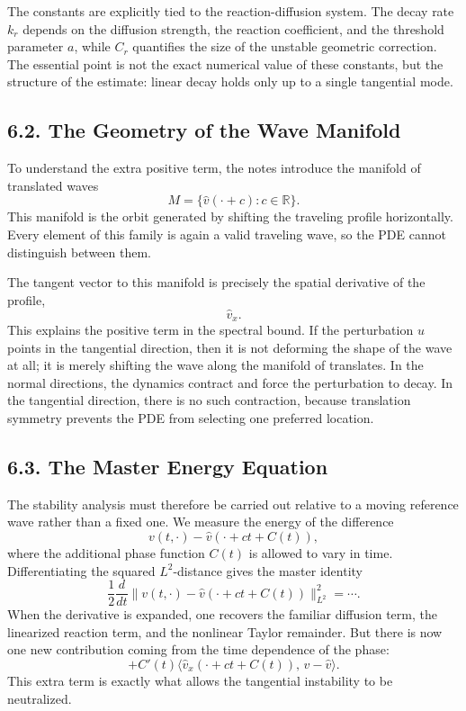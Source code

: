 \documentclass[11pt]{article}
\theoremstyle{definition}
\theoremstyle{remark}
\begin{document}
The constants are explicitly tied to the reaction-diffusion system. The decay rate \(k_r\) depends on the diffusion strength, the reaction coefficient, and the threshold parameter \(a\), while \(C_r\) quantifies the size of the unstable geometric correction. The essential point is not the exact numerical value of these constants, but the structure of the estimate: linear decay holds only up to a single tangential mode.

\subsection*{6.2. The Geometry of the Wave Manifold}
To understand the extra positive term, the notes introduce the manifold of translated waves
\[
M=\{\widehat v(\cdot+c):c\in\mathbb R\}.
\]
This manifold is the orbit generated by shifting the traveling profile horizontally. Every element of this family is again a valid traveling wave, so the PDE cannot distinguish between them.

The tangent vector to this manifold is precisely the spatial derivative of the profile,
\[
\widehat v_x.
\]
This explains the positive term in the spectral bound. If the perturbation \(u\) points in the tangential direction, then it is not deforming the shape of the wave at all; it is merely shifting the wave along the manifold of translates. In the normal directions, the dynamics contract and force the perturbation to decay. In the tangential direction, there is no such contraction, because translation symmetry prevents the PDE from selecting one preferred location.

\subsection*{6.3. The Master Energy Equation}
The stability analysis must therefore be carried out relative to a moving reference wave rather than a fixed one. We measure the energy of the difference
\[
v(t,\cdot)-\widehat v(\cdot+ct+C(t)),
\]
where the additional phase function \(C(t)\) is allowed to vary in time. Differentiating the squared \(L^2\)-distance gives the master identity
\[
\frac12\frac{d}{dt}\|v(t,\cdot)-\widehat v(\cdot+ct+C(t))\|_{L^2}^2=\cdots.
\]
When the derivative is expanded, one recovers the familiar diffusion term, the linearized reaction term, and the nonlinear Taylor remainder. But there is now one new contribution coming from the time dependence of the phase:
\[
+C'(t)\langle \widehat v_x(\cdot+ct+C(t)),\,v-\widehat v\rangle.
\]
This extra term is exactly what allows the tangential instability to be neutralized.
\end{document}
